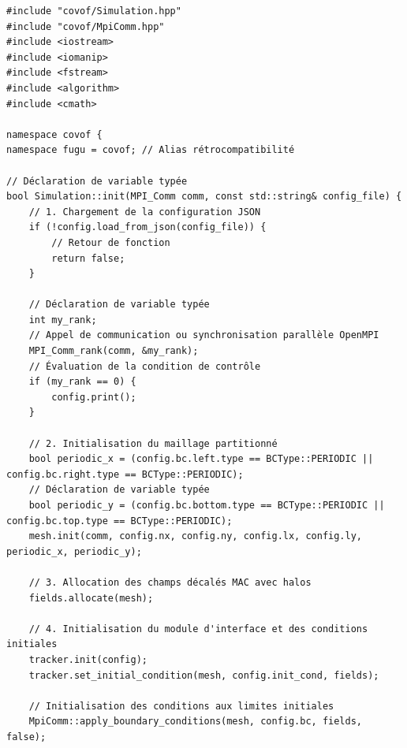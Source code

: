 \documentclass[10pt,a4paper,oneside]{book}
\begin{document}
\begin{lstlisting}[language={[11]C++}]
#include "covof/Simulation.hpp"
#include "covof/MpiComm.hpp"
#include <iostream>
#include <iomanip>
#include <fstream>
#include <algorithm>
#include <cmath>

namespace covof {
namespace fugu = covof; // Alias rétrocompatibilité

// Déclaration de variable typée
bool Simulation::init(MPI_Comm comm, const std::string& config_file) {
    // 1. Chargement de la configuration JSON
    if (!config.load_from_json(config_file)) {
        // Retour de fonction
        return false;
    }

    // Déclaration de variable typée
    int my_rank;
    // Appel de communication ou synchronisation parallèle OpenMPI
    MPI_Comm_rank(comm, &my_rank);
    // Évaluation de la condition de contrôle
    if (my_rank == 0) {
        config.print();
    }

    // 2. Initialisation du maillage partitionné
    bool periodic_x = (config.bc.left.type == BCType::PERIODIC || config.bc.right.type == BCType::PERIODIC);
    // Déclaration de variable typée
    bool periodic_y = (config.bc.bottom.type == BCType::PERIODIC || config.bc.top.type == BCType::PERIODIC);
    mesh.init(comm, config.nx, config.ny, config.lx, config.ly, periodic_x, periodic_y);

    // 3. Allocation des champs décalés MAC avec halos
    fields.allocate(mesh);

    // 4. Initialisation du module d'interface et des conditions initiales
    tracker.init(config);
    tracker.set_initial_condition(mesh, config.init_cond, fields);

    // Initialisation des conditions aux limites initiales
    MpiComm::apply_boundary_conditions(mesh, config.bc, fields, false);


\end{lstlisting}
\end{document}
